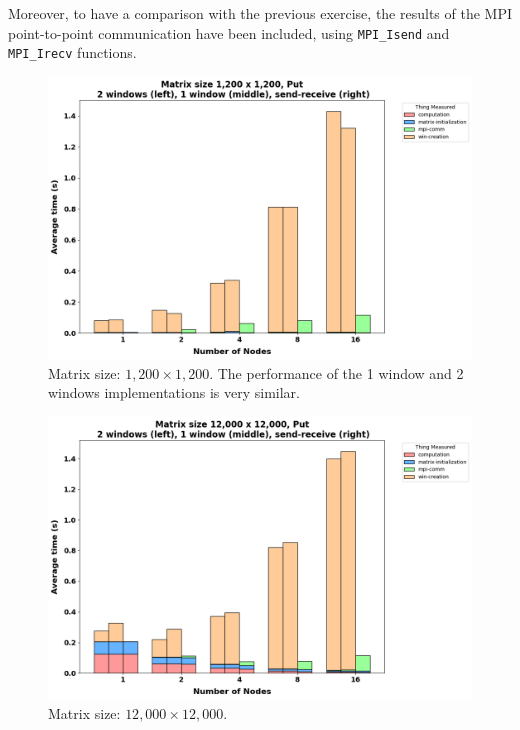 \documentclass{article}
\begin{document}
    \noindent Moreover, to have a comparison with the previous exercise, the results of the MPI point-to-point communication have been included, using \texttt{MPI\_Isend} and \texttt{MPI\_Irecv} functions.


    \begin{figure}
        \includegraphics[width=\textwidth]{./images/1winvs2win-1200}
        \caption{Matrix size: $1,200 \times 1,200$. The performance of the 1 window and 2 windows implementations is very similar.}
        \label{fig:figure5}
    \end{figure}

    \begin{figure}
        \includegraphics[width=\textwidth]{./images/1winvs2win-12k}
        \caption{Matrix size: $12,000 \times 12,000$.}
        \label{fig:figure6}
    \end{figure}
\end{document}
